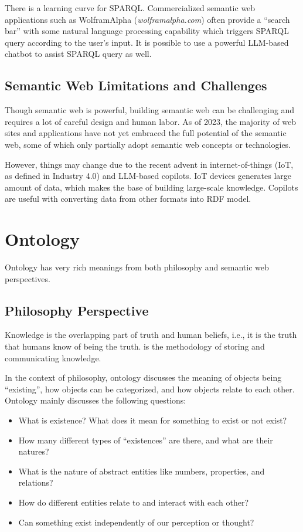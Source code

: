 There is a learning curve for SPARQL. Commercialized semantic web applications such as WolframAlpha (\textit{wolframalpha.com}) often provide a ``search bar'' with some natural language processing capability which triggers SPARQL query according to the user's input. It is possible to use a powerful LLM-based chatbot to assist SPARQL query as well.

\subsection{Semantic Web Limitations and Challenges}

Though semantic web is powerful, building semantic web can be challenging and requires a lot of careful design and human labor. As of 2023, the majority of web sites and applications have not yet embraced the full potential of the semantic web, some of which only partially adopt semantic web concepts or technologies.

However, things may change due to the recent advent in internet-of-things (IoT, as defined in Industry 4.0) and LLM-based copilots. IoT devices generates large amount of data, which makes the base of building large-scale knowledge. Copilots are useful with converting data from other formats into RDF model. 


\section{Ontology} \label{sec:ontology}

Ontology has very rich meanings from both philosophy and semantic web perspectives.

\subsection{Philosophy Perspective}

Knowledge is the overlapping part of truth and human beliefs, i.e., it is the truth that humans know of being the truth.  is the methodology of storing and communicating knowledge.

In the context of philosophy, ontology discusses the meaning of objects being ``existing'', how objects can be categorized, and how objects relate to each other. Ontology mainly discusses the following questions:

\begin{itemize}
  \item What is existence? What does it mean for something to exist or not exist?
  \item How many different types of ``existences'' are there, and what are their natures?
  \item What is the nature of abstract entities like numbers, properties, and relations?
  \item How do different entities relate to and interact with each other?
  \item Can something exist independently of our perception or thought?
\end{itemize}

